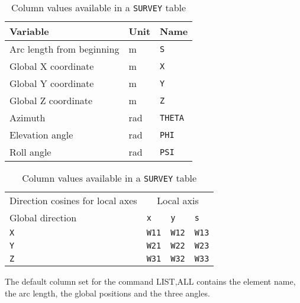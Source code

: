 \begin{table}[Ht] \footnotesize
  \begin{center}
    \caption{Column values available in a \texttt{SURVEY} table}
    \label{tab:survey_col}
    \begin{tabular}{|l|l|l|}
      \hline
      Variable & Unit & Name \\
      \hline
      Arc length from beginning & m & \texttt{S}\index{S} \\
      Global X coordinate & m & \texttt{X}\index{X} \\
      Global Y coordinate & m & \texttt{Y}\index{Y} \\
      Global Z coordinate  & m & \texttt{Z}\index{Z} \\
      Azimuth & rad & \texttt{THETA}\index{THETA} \\
      Elevation angle & rad & \texttt{PHI}\index{PHI} \\
      Roll angle & rad & \texttt{PSI}\index{PSI} \\
      \hline
    \end{tabular}

    \begin{tabular}{|l|l|l|l|}
      \hline
      Direction cosines for local axes & \multicolumn{3}{c|}{Local axis} \\
      Global direction & \texttt{x} & \texttt{y} & \texttt{s} \\
      \hline
      \texttt{X} & \texttt{W11}\index{W11} &
      \texttt{W12}\index{W12} & \texttt{W13}\index{W13} \\
      \texttt{Y} & \texttt{W21}\index{W21} &
      \texttt{W22}\index{W22} & \texttt{W23}\index{W23} \\
      \texttt{Z} & \texttt{W31}\index{W31} &
      \texttt{W32}\index{W32} & \texttt{W33}\index{W33} \\
      \hline
    \end{tabular}
  \end{center}
\end{table}
\clearpage
The default column set for the command
{LIST,ALL}  contains the element name,
the arc length, the global positions and the three angles.


